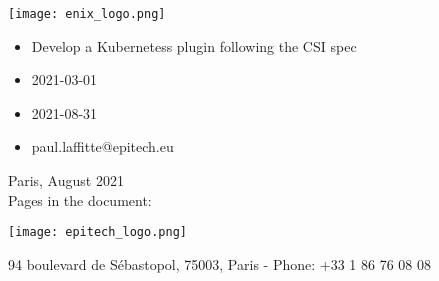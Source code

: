 \pagestyle{fancy}
\thispagestyle{empty}

\begin{spacing}{1.5}
    \center
    \texttt{[image: enix\_logo.png]}\\
    \vspace{0.5 cm}
    {\fontsize{16}{18}\selectfont {}}
\end{spacing}

\vspace{1 cm}
\noindent\begin{minipage}[t]{6cm}
    \begin{itemize}[label=, leftmargin=*, itemsep=0pt]
        \item {} Develop a Kubernetess plugin following the CSI spec
        \item {} 2021-03-01
        \item {} 2021-08-31
        \item {} paul.laffitte@epitech.eu
    \end{itemize}
\end{minipage}
\hfill
\begin{minipage}[t]{5.4cm}
    \begin{flushleft}
        \begin{spacing}{1.8}
            Paris, August 2021\\
            Pages in the document: \pageref{LastPage}
        \end{spacing}
    \end{flushleft}
\end{minipage}

\vspace{1cm}

\begin{flushright}
    {\Huge \thetitle\\}
    \hrulefill \\ \vspace{0.5 cm}
    {\LARGE \subtitle}
\end{flushright}
\vspace{1.5 cm}

\begin{center}
    \texttt{[image: epitech\_logo.png]}
    \vspace{0.5 cm}

    \vspace{4.5cm}

    {\scriptsize 94 boulevard de Sébastopol, 75003, Paris - Phone: +33 1 86 76 08 08}
\end{center}

\newpage
